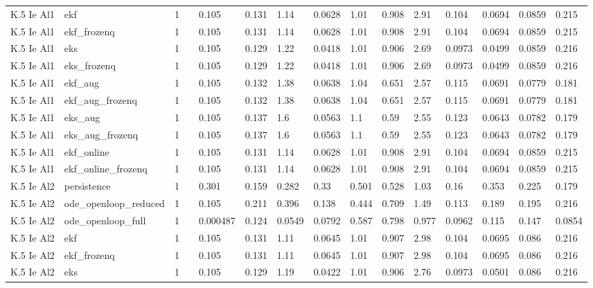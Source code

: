 \begin{table}[t]
\begin{tabular}{lllllllllllllll}
K.5 Ie Al1 & ekf & 1 &  & 0.105 & 0.131 & 1.14 & 0.0628 & 1.01 & 0.908 & 2.91 & 0.104 & 0.0694 & 0.0859 & 0.215 \\
K.5 Ie Al1 & ekf\_frozenq & 1 &  & 0.105 & 0.131 & 1.14 & 0.0628 & 1.01 & 0.908 & 2.91 & 0.104 & 0.0694 & 0.0859 & 0.215 \\
K.5 Ie Al1 & eks & 1 &  & 0.105 & 0.129 & 1.22 & 0.0418 & 1.01 & 0.906 & 2.69 & 0.0973 & 0.0499 & 0.0859 & 0.216 \\
K.5 Ie Al1 & eks\_frozenq & 1 &  & 0.105 & 0.129 & 1.22 & 0.0418 & 1.01 & 0.906 & 2.69 & 0.0973 & 0.0499 & 0.0859 & 0.216 \\
K.5 Ie Al1 & ekf\_aug & 1 &  & 0.105 & 0.132 & 1.38 & 0.0638 & 1.04 & 0.651 & 2.57 & 0.115 & 0.0691 & 0.0779 & 0.181 \\
K.5 Ie Al1 & ekf\_aug\_frozenq & 1 &  & 0.105 & 0.132 & 1.38 & 0.0638 & 1.04 & 0.651 & 2.57 & 0.115 & 0.0691 & 0.0779 & 0.181 \\
K.5 Ie Al1 & eks\_aug & 1 &  & 0.105 & 0.137 & 1.6 & 0.0563 & 1.1 & 0.59 & 2.55 & 0.123 & 0.0643 & 0.0782 & 0.179 \\
K.5 Ie Al1 & eks\_aug\_frozenq & 1 &  & 0.105 & 0.137 & 1.6 & 0.0563 & 1.1 & 0.59 & 2.55 & 0.123 & 0.0643 & 0.0782 & 0.179 \\
K.5 Ie Al1 & ekf\_online & 1 &  & 0.105 & 0.131 & 1.14 & 0.0628 & 1.01 & 0.908 & 2.91 & 0.104 & 0.0694 & 0.0859 & 0.215 \\
K.5 Ie Al1 & ekf\_online\_frozenq & 1 &  & 0.105 & 0.131 & 1.14 & 0.0628 & 1.01 & 0.908 & 2.91 & 0.104 & 0.0694 & 0.0859 & 0.215 \\
K.5 Ie Al2 & persistence & 1 &  & 0.301 & 0.159 & 0.282 & 0.33 & 0.501 & 0.528 & 1.03 & 0.16 & 0.353 & 0.225 & 0.179 \\
K.5 Ie Al2 & ode\_openloop\_reduced & 1 &  & 0.105 & 0.211 & 0.396 & 0.138 & 0.444 & 0.709 & 1.49 & 0.113 & 0.189 & 0.195 & 0.216 \\
K.5 Ie Al2 & ode\_openloop\_full & 1 &  & 0.000487 & 0.124 & 0.0549 & 0.0792 & 0.587 & 0.798 & 0.977 & 0.0962 & 0.115 & 0.147 & 0.0854 \\
K.5 Ie Al2 & ekf & 1 &  & 0.105 & 0.131 & 1.11 & 0.0645 & 1.01 & 0.907 & 2.98 & 0.104 & 0.0695 & 0.086 & 0.216 \\
K.5 Ie Al2 & ekf\_frozenq & 1 &  & 0.105 & 0.131 & 1.11 & 0.0645 & 1.01 & 0.907 & 2.98 & 0.104 & 0.0695 & 0.086 & 0.216 \\
K.5 Ie Al2 & eks & 1 &  & 0.105 & 0.129 & 1.19 & 0.0422 & 1.01 & 0.906 & 2.76 & 0.0973 & 0.0501 & 0.086 & 0.216 \\

\end{tabular}
\end{table}
